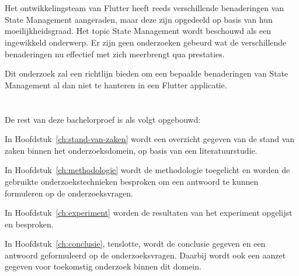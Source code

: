
\section{}
\label{sec:onderzoeksdoelstelling}

Het ontwikkelingsteam van Flutter heeft reeds verschillende benaderingen van State Management aangeraden, maar deze zijn opgedeeld op basis van hun moeilijkheidsgraad. Het topic State Management wordt beschouwd als een ingewikkeld onderwerp. Er zijn geen onderzoeken gebeurd wat de verschillende benaderingen nu effectief met zich meerbrengt qua prestaties.

Dit onderzoek zal een richtlijn bieden om een bepaalde benaderingen van State Management al dan niet te hanteren in een Flutter applicatie. 

\section{}
\label{sec:opzet-bachelorproef}


De rest van deze bachelorproef is als volgt opgebouwd:

In Hoofdstuk~\ref{ch:stand-van-zaken} wordt een overzicht gegeven van de stand van zaken binnen het onderzoeksdomein, op basis van een literatuurstudie.

In Hoofdstuk~\ref{ch:methodologie} wordt de methodologie toegelicht en worden de gebruikte onderzoekstechnieken besproken om een antwoord te kunnen formuleren op de onderzoeksvragen.

In Hoofdstuk~\ref{ch:experiment} worden de resultaten van het experiment opgelijst en besproken.

In Hoofdstuk~\ref{ch:conclusie}, tenslotte, wordt de conclusie gegeven en een antwoord geformuleerd op de onderzoeksvragen. Daarbij wordt ook een aanzet gegeven voor toekomstig onderzoek binnen dit domein.

